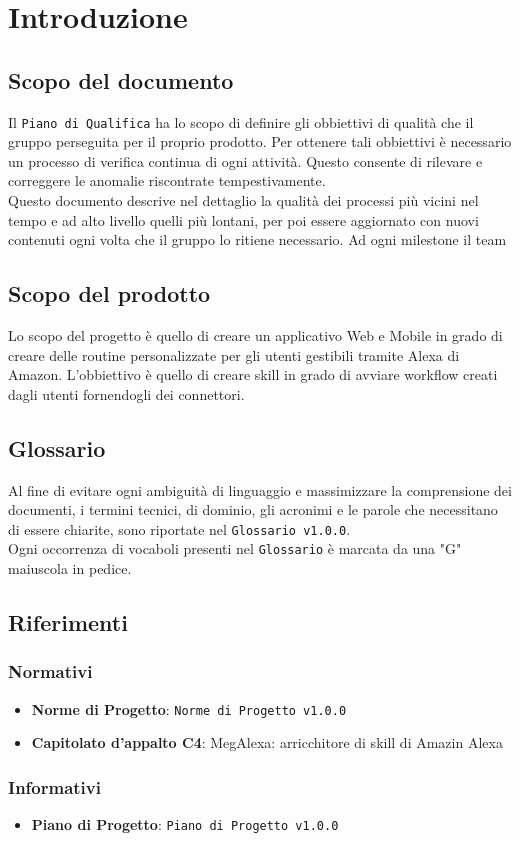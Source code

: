 \chapter{Introduzione}
\section{Scopo del documento}
Il \texttt{Piano di Qualifica} ha lo scopo di definire gli obbiettivi di qualità che il gruppo perseguita per il proprio prodotto. Per ottenere tali obbiettivi è necessario un processo di verifica continua di ogni attività. Questo consente di rilevare e correggere le anomalie riscontrate tempestivamente.\\
Questo documento descrive nel dettaglio la qualità dei processi più vicini nel tempo e ad alto livello quelli più lontani, per poi essere aggiornato con nuovi contenuti ogni volta che il gruppo lo ritiene necessario. Ad ogni milestone il team 
\section{Scopo del prodotto}
Lo scopo del progetto è quello di creare un applicativo Web e Mobile in grado di creare delle routine personalizzate per gli utenti gestibili tramite Alexa di Amazon. L'obbiettivo è quello di creare skill in grado di avviare workflow creati dagli utenti fornendogli dei connettori.
\section{Glossario}
Al fine di evitare ogni ambiguità di linguaggio e massimizzare la comprensione dei documenti, i termini tecnici, di dominio, gli acronimi e le parole che necessitano di essere chiarite, sono riportate nel \texttt{Glossario v1.0.0}.\\
Ogni occorrenza di vocaboli presenti nel \texttt{Glossario} è marcata da una "G" maiuscola in pedice.
\section{Riferimenti}
\subsection{Normativi}
\begin{itemize}
	\item  \textbf{Norme di Progetto}: \texttt{Norme di Progetto v1.0.0}
	\item \textbf{Capitolato d'appalto C4}: MegAlexa: arricchitore di skill di Amazin Alexa
\end{itemize}
\subsection{Informativi}
\begin{itemize}
	\item \textbf{Piano di Progetto}: \texttt{Piano di Progetto v1.0.0}
\end{itemize}
